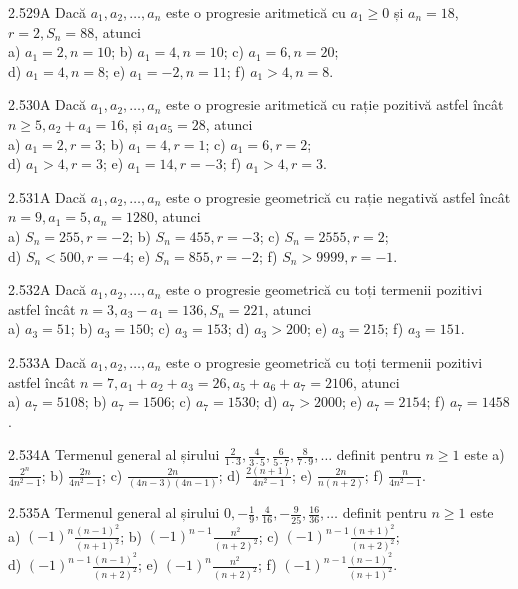 \documentclass[11pt]{article}
\begin{document}
2.529A Dacă $a_{1}, a_{2}, \ldots, a_{n}$ este o progresie aritmetică cu $a_{1} \geq 0$ și $a_{n}=18$, $r=2, S_{n}=88$, atunci\\ a) $a_{1}=2, n=10$; b) $a_{1}=4, n=10$; c) $a_{1}=6, n=20$;\\ d) $a_{1}=4, n=8$; e) $a_{1}=-2, n=11$; f) $a_{1}>4, n=8$.

2.530A Dacă $a_{1}, a_{2}, \ldots, a_{n}$ este o progresie aritmetică cu rație pozitivă astfel încât $n \geq 5, a_{2}+a_{4}=16$, și $a_{1} a_{5}=28$, atunci\\ a) $a_{1}=2, r=3$; b) $a_{1}=4, r=1$; c) $a_{1}=6, r=2$;\\ d) $a_{1}>4, r=3$; e) $a_{1}=14, r=-3$; f) $a_{1}>4, r=3$.

2.531A Dacă $a_{1}, a_{2}, \ldots, a_{n}$ este o progresie geometrică cu rație negativă astfel încât $n=9, a_{1}=5, a_{n}=1280$, atunci\\ a) $S_{n}=255, r=-2$; b) $S_{n}=455, r=-3$; c) $S_{n}=2555, r=2$;\\ d) $S_{n}<500, r=-4$; e) $S_{n}=855, r=-2$; f) $S_{n}>9999, r=-1$.

2.532A Dacă $a_{1}, a_{2}, \ldots, a_{n}$ este o progresie geometrică cu toți termenii pozitivi astfel încât $n=3, a_{3}-a_{1}=136, S_{n}=221$, atunci\\ a) $a_{3}=51$; b) $a_{3}=150$; c) $a_{3}=153$; d) $a_{3}>200$; e) $a_{3}=215$; f) $a_{3}=151$.

2.533A Dacă $a_{1}, a_{2}, \ldots, a_{n}$ este o progresie geometrică cu toți termenii pozitivi astfel încât $n=7, a_{1}+a_{2}+a_{3}=26, a_{5}+a_{6}+a_{7}=2106$, atunci\\ a) $a_{7}=5108$; b) $a_{7}=1506$; c) $a_{7}=1530$; d) $a_{7}>2000$; e) $a_{7}=2154$; f) $a_{7}=1458$.

2.534A Termenul general al șirului $\frac{2}{1 \cdot 3}, \frac{4}{3 \cdot 5}, \frac{6}{5 \cdot 7}, \frac{8}{7 \cdot 9}, \ldots$ definit pentru $n \geq 1$ este a) $\frac{2^{n}}{4 n^{2}-1}$; b) $\frac{2 n}{4 n^{2}-1}$; c) $\frac{2 n}{(4 n-3)(4 n-1)}$; d) $\frac{2(n+1)}{4 n^{2}-1}$; e) $\frac{2 n}{n(n+2)}$; f) $\frac{n}{4 n^{2}-1}$.

2.535A Termenul general al șirului $0,-\frac{1}{9}, \frac{4}{16},-\frac{9}{25}, \frac{16}{36}, \ldots$ definit pentru $n \geq 1$ este\\ a) $(-1)^{n} \frac{(n-1)^{2}}{(n+1)^{2}}$; b) $(-1)^{n-1} \frac{n^{2}}{(n+2)^{2}}$; c) $(-1)^{n-1} \frac{(n+1)^{2}}{(n+2)^{2}}$;\\ d) $(-1)^{n-1} \frac{(n-1)^{2}}{(n+2)^{2}}$; e) $(-1)^{n} \frac{n^{2}}{(n+2)^{2}}$; f) $(-1)^{n-1} \frac{(n-1)^{2}}{(n+1)^{2}}$.
\end{document}
